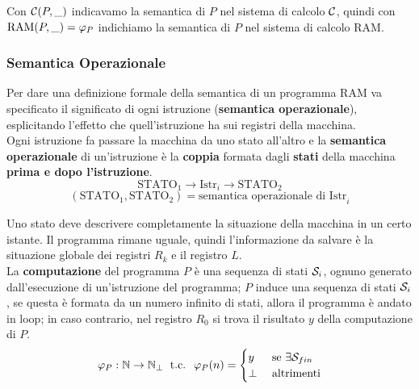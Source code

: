 Con $\mathcal{C}(P,\_)$ indicavamo la semantica di $P$ nel sistema di calcolo $\mathcal{C}$, quindi con $\text{RAM}(P,\_) = \varphi_P$ indichiamo la semantica di $P$ nel sistema di calcolo RAM.\\

\subsubsection{Semantica Operazionale}

Per dare una definizione formale della semantica di un programma RAM va specificato il significato di ogni istruzione (\textbf{semantica operazionale}), esplicitando l'effetto che quell'istruzione ha sui registri della macchina.\\

Ogni istruzione fa passare la macchina da uno stato all'altro e la \textbf{semantica operazionale} di un'istruzione è la \textbf{coppia} formata dagli \textbf{stati} della macchina \textbf{prima e dopo l'istruzione}.
$$ \text{STATO}_1 \rightarrow \boxed{\text{Istr}_i} \rightarrow \text{STATO}_2 $$
$$ (\text{STATO}_1,\text{STATO}_2) = \text{semantica operazionale di Istr}_i $$

Uno stato deve descrivere completamente la situazione della macchina in un certo istante. Il programma rimane uguale, quindi l'informazione da salvare è la situazione globale dei registri $R_k$ e il registro $L$.\\

La \textbf{computazione} del programma $P$ è una sequenza di stati $\mathcal{S}_i$, ognuno generato dall'esecuzione di un'istruzione del programma; $P$ induce una sequenza di stati $\mathcal{S}_i$, se questa è formata da un numero infinito di stati, allora il programma è andato in loop; in caso contrario, nel registro $R_0$ si trova il risultato $y$ della computazione di $P$.
$$ 
\varphi_P: \mathbb{N} \rightarrow \mathbb{N}_\bot \; \text{ t.c. } \; \varphi_P(n) = \begin{cases}
	y & \text{ se } \exists \mathcal{S}_{fin} \\
	\bot & \text{ altrimenti}
\end{cases}
$$

